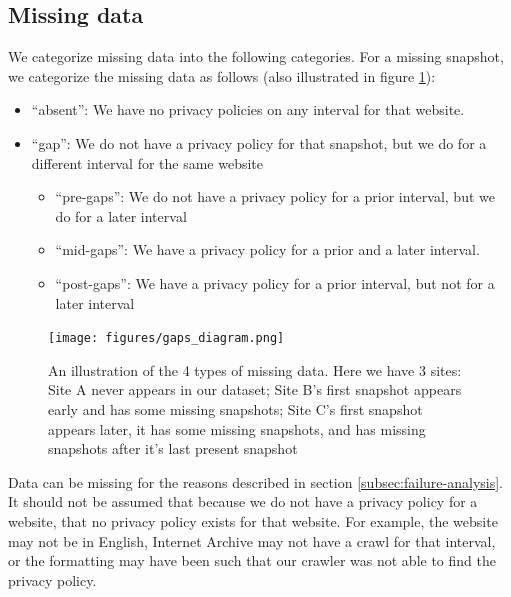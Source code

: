 \subsection{Missing data}
\label{subsec:data-gaps}

\newcommand{\absentPerc}{75.9}
\newcommand{\absentEngPerc}{47.3}
\newcommand{\absentEngOneKPerc}{23.8}
\newcommand{\gapsPerc}{82.2}
\newcommand{\pregapsPerc}{78.0}
\newcommand{\midgapsPerc}{8.0}
\newcommand{\postgapsPerc}{14.1}

\newcommand{\midgapsPossPerc}{32.0}
\newcommand{\midgapsDomainsPerc}{55.0}
\newcommand{\lifespanNoGaps}{11.2}
\newcommand{\lifespanGaps}{16.8}

\newcommand{\numpresentdoms}{130,620}
\newcommand{\numabsentenglishdoms}{150,192}
We categorize missing data into the following categories. For a missing snapshot, we categorize the missing data as follows (also illustrated in figure \ref{fig:missing_types}):
\begin{itemize}
    \item ``absent'': We have no privacy policies on any interval for that website.
    \item ``gap'': We do not have a privacy policy for that snapshot, but we do for a different interval for the same website
    \begin{itemize}
        \item ``pre-gaps'': We do not have a privacy policy for a prior interval, but we do for a later interval
        \item ``mid-gaps'': We have a privacy policy for a prior and a later interval.
        \item ``post-gaps'': We have a privacy policy for a prior interval, but not for a later interval
    \end{itemize}
\end{itemize}


\begin{figure}[t]
\centering
\texttt{[image: figures/gaps\_diagram.png]}
\caption{An illustration of the 4 types of missing data. Here we have 3 sites: Site A never appears in our dataset; Site B's first snapshot appears early and has some missing snapshots; Site C's first snapshot appears later, it has some missing snapshots, and has missing snapshots after it's last present snapshot}
\label{fig:missing_types}
\end{figure}

Data can be missing for the reasons described in section \ref{subsec:failure-analysis}. It should not be assumed that because we do not have a privacy policy for a website, that no privacy policy exists for that website. For example, the website may not be in English, Internet Archive may not have a crawl for that interval, or the formatting may have been such that our crawler was not able to find the privacy policy.

